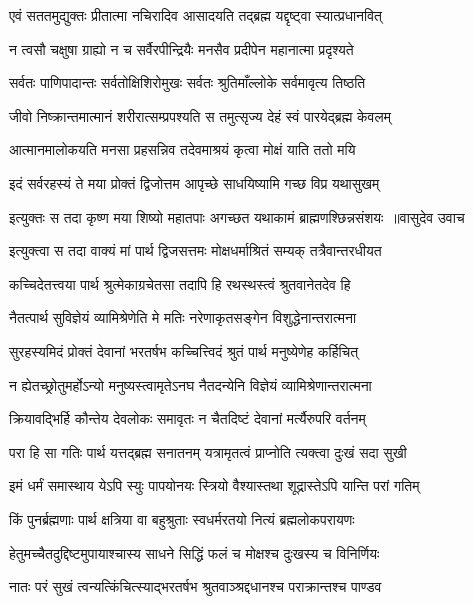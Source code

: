 \twolineshloka
{एवं सततमुद्युक्तः प्रीतात्मा नचिरादिव}
{आसादयति तद्ब्रह्म यद्दृष्ट्वा स्यात्प्रधानवित्}


\twolineshloka
{न त्वसौ चक्षुषा ग्राह्यो न च सर्वैरपीन्द्रियैः}
{मनसैव प्रदीपेन महानात्मा प्रदृश्यते}


\twolineshloka
{सर्वतः पाणिपादान्तः सर्वतोक्षिशिरोमुखः}
{सर्वतः श्रुतिमाँल्लोके सर्वमावृत्य तिष्ठति}


\twolineshloka
{जीवो निष्क्रान्तमात्मानं शरीरात्सम्प्रपश्यति}
{स तमुत्सृज्य देहं स्वं पारयेद्ब्रह्म केवलम्}


\twolineshloka
{आत्मानमालोकयति मनसा प्रहसन्निव}
{तदेवमाश्रयं कृत्वा मोक्षं याति ततो मयि}


\twolineshloka
{इदं सर्वरहस्यं ते मया प्रोक्तं द्विजोत्तम}
{आपृच्छे साधयिष्यामि गच्छ विप्र यथासुखम्}


\threelineshloka
{इत्युक्तः स तदा कृष्ण मया शिष्यो महातपाः}
{अगच्छत यथाकामं ब्राह्मणश्छिन्नसंशयः ॥वासुदेव उवाच}
{}


\twolineshloka
{इत्युक्त्वा स तदा वाक्यं मां पार्थ द्विजसत्तमः}
{मोक्षधर्माश्रितं सम्यक् तत्रैवान्तरधीयत}


\twolineshloka
{कच्चिदेतत्त्वया पार्थ श्रुत्मेकाग्रचेतसा}
{तदापि हि रथस्थस्त्वं श्रुतवानेतदेव हि}


\twolineshloka
{नैतत्पार्थ सुविज्ञेयं व्यामिश्रेणेति मे मतिः}
{नरेणाकृतसङ्गेन विशुद्धेनान्तरात्मना}


\twolineshloka
{सुरहस्यमिदं प्रोक्तं देवानां भरतर्षभ}
{कच्चित्त्विदं श्रुतं पार्थ मनुष्येणेह कर्हिचित्}


\twolineshloka
{न ह्येतच्छ्रोतुमर्होऽन्यो मनुष्यस्त्वामृतेऽनघ}
{नैतदन्येनि विज्ञेयं व्यामिश्रेणान्तरात्मना}


\twolineshloka
{क्रियावद्भिर्हि कौन्तेय देवलोकः समावृतः}
{न चैतदिष्टं देवानां मर्त्यैरुपरि वर्तनम्}


\twolineshloka
{परा हि सा गतिः पार्थ यत्तद्ब्रह्म सनातनम्}
{यत्रामृतत्वं प्राप्नोति त्यक्त्वा दुःखं सदा सुखी}


\twolineshloka
{इमं धर्मं समास्थाय येऽपि स्युः पापयोनयः}
{स्त्रियो वैश्यास्तथा शूद्रास्तेऽपि यान्ति परां गतिम्}


\twolineshloka
{किं पुनर्ब्रह्मणाः पार्थ क्षत्रिया वा बहुश्रुताः}
{स्वधर्मरतयो नित्यं ब्रह्मलोकपरायणः}


\twolineshloka
{हेतुमच्चैतदुद्दिष्टमुपायाश्चास्य साधने}
{सिद्धिं फलं च मोक्षश्च दुःखस्य च विनिर्णियः}


\twolineshloka
{नातः परं सुखं त्वन्यत्किंचित्स्याद्भरतर्षभ}
{श्रुतवाञ्श्रद्दधानश्च पराक्रान्तश्च पाण्डव}


